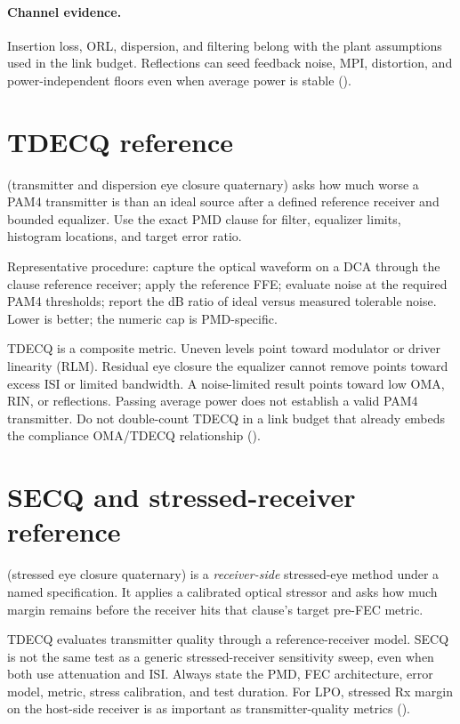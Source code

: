 \paragraph{Channel evidence.}
\label{sec:optical-channel}
Insertion loss, ORL, dispersion, and filtering belong with the plant
assumptions used in the link budget. Reflections can seed feedback noise, MPI,
distortion, and power-independent floors even when average power is stable
().

\section{TDECQ reference}
\label{sec:tdecq}

 (transmitter and dispersion eye closure quaternary) asks how much
worse a PAM4 transmitter is than an ideal source after a defined reference
receiver and bounded equalizer. Use the exact PMD clause for filter, equalizer
limits, histogram locations, and target error ratio.

Representative procedure: capture the optical waveform on a DCA through the
clause reference receiver; apply the reference FFE; evaluate noise at the
required PAM4 thresholds; report the dB ratio of ideal versus measured
tolerable noise. Lower is better; the numeric cap is PMD-specific.

TDECQ is a composite metric. Uneven levels point toward modulator or driver
linearity (RLM). Residual eye closure the equalizer cannot remove points toward
excess ISI or limited bandwidth. A noise-limited result points toward low OMA,
RIN, or reflections. Passing average power does not establish a valid PAM4
transmitter. Do not double-count TDECQ in a link budget that already embeds the
compliance OMA/TDECQ relationship ().

\section{SECQ and stressed-receiver reference}
\label{sec:secq}

 (stressed eye closure quaternary) is a \emph{receiver-side}
stressed-eye method under a named specification. It applies a calibrated optical
stressor and asks how much margin remains before the receiver hits that clause's
target pre-FEC metric.

TDECQ evaluates transmitter quality through a reference-receiver model. SECQ is
not the same test as a generic stressed-receiver sensitivity sweep, even when
both use attenuation and ISI. Always state the PMD, FEC architecture, error
model, metric, stress calibration, and test duration. For LPO, stressed Rx
margin on the host-side receiver is as important as transmitter-quality metrics
().


